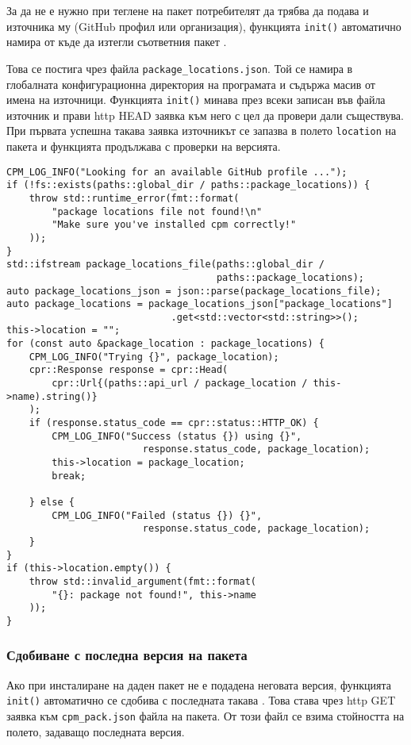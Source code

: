 За да не е нужно при теглене на пакет потребителят да трябва да подава и
източника му (GitHub профил или организация), функцията \texttt{init()}
автоматично намира от къде да изтегли съответния пакет
.

Това се постига чрез файла \texttt{package\_locations.json}. Той се намира в
глобалната конфигурационна директория на програмата и съдържа масив от имена на
източници. Функцията \texttt{init()} минава през всеки записан във файла
източник и прави \acrshort{http} HEAD заявка към него с цел да провери дали
съществува. При първата успешна такава заявка източникът се запазва в полето
\texttt{location} на пакета и функцията продължава с проверки на версията.

\begin{lstlisting}[style=cpp,
				   caption=Намиране на източник за теглене на пакета,
				   label={lst:init-location}]
CPM_LOG_INFO("Looking for an available GitHub profile ...");
if (!fs::exists(paths::global_dir / paths::package_locations)) {
	throw std::runtime_error(fmt::format(
		"package locations file not found!\n"
		"Make sure you've installed cpm correctly!"
	));
}
std::ifstream package_locations_file(paths::global_dir /
									 paths::package_locations);
auto package_locations_json = json::parse(package_locations_file);
auto package_locations = package_locations_json["package_locations"]
						     .get<std::vector<std::string>>();
this->location = "";
for (const auto &package_location : package_locations) {
	CPM_LOG_INFO("Trying {}", package_location);
	cpr::Response response = cpr::Head(
		cpr::Url{(paths::api_url / package_location / this->name).string()}
	);
	if (response.status_code == cpr::status::HTTP_OK) {
		CPM_LOG_INFO("Success (status {}) using {}",
						response.status_code, package_location);
		this->location = package_location;
		break;

	} else {
		CPM_LOG_INFO("Failed (status {}) {}",
						response.status_code, package_location);
	}
}
if (this->location.empty()) {
	throw std::invalid_argument(fmt::format(
		"{}: package not found!", this->name
	));
}
\end{lstlisting}


\subsubsection{Сдобиване с последна версия на пакета}

Ако при инсталиране на даден пакет не е подадена неговата версия, функцията
\texttt{init()} автоматично се сдобива с последната такава
. Това става чрез \acrshort{http} GET заявка към
\texttt{cpm\_pack.json} файла на пакета. От този файл се взима стойността на
полето, задаващо последната версия. \\

